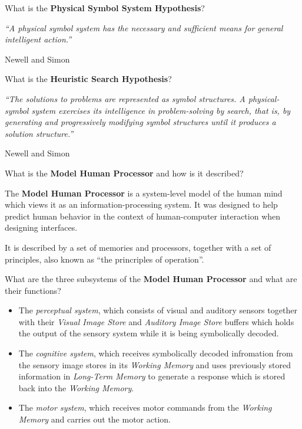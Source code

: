 
\begin{flashcard}[Question]{What is the \textbf{Physical Symbol System Hypothesis}?}
\begin{center}
\textit{``A physical symbol system has the necessary and sufficient means for general intelligent action.''}

Newell and Simon
\end{center}
\end{flashcard}

\begin{flashcard}[Question]{What is the \textbf{Heuristic Search Hypothesis}?}
\begin{center}
\textit{``The solutions to problems are represented as symbol structures. A physical-symbol system exercises its intelligence in problem-solving by search, that is, by generating and progressively modifying symbol structures until it produces a solution structure.''}

Newell and Simon
\end{center}
\end{flashcard}

\begin{flashcard}[Question]{What is the \textbf{Model Human Processor} and how is it described?}
\begin{center}
The \textbf{Model Human Processor} is a system-level model of the human mind which views it as an information-processing system. It was designed to help predict human behavior in the context of human-computer interaction when designing interfaces.

\medskip

It is described by a set of memories and processors, together with a set of principles, also known as ``the princriples of operation''.
\end{center}
\end{flashcard}

\begin{flashcard}[Question]{What are the three subsystems of the \textbf{Model Human Processor} and what are their functions?}
\begin{center}
\begin{itemize}
\item The \textit{perceptual system}, which consists of visual and auditory sensors together with their \textit{Visual Image Store} and \textit{Auditory Image Store} buffers which holds the output of the sensory system while it is being symbolically decoded.
\item The \textit{cognitive system}, which receives symbolically decoded infromation from the sensory image stores in its \textit{Working Memory} and uses previously stored information in \textit{Long-Term Memory} to generate a response which is stored back into the \textit{Working Memory}.
\item The \textit{motor system}, which receives motor commands from the \textit{Working Memory} and carries out the motor action.
\end{itemize}
\end{center}
\end{flashcard}

